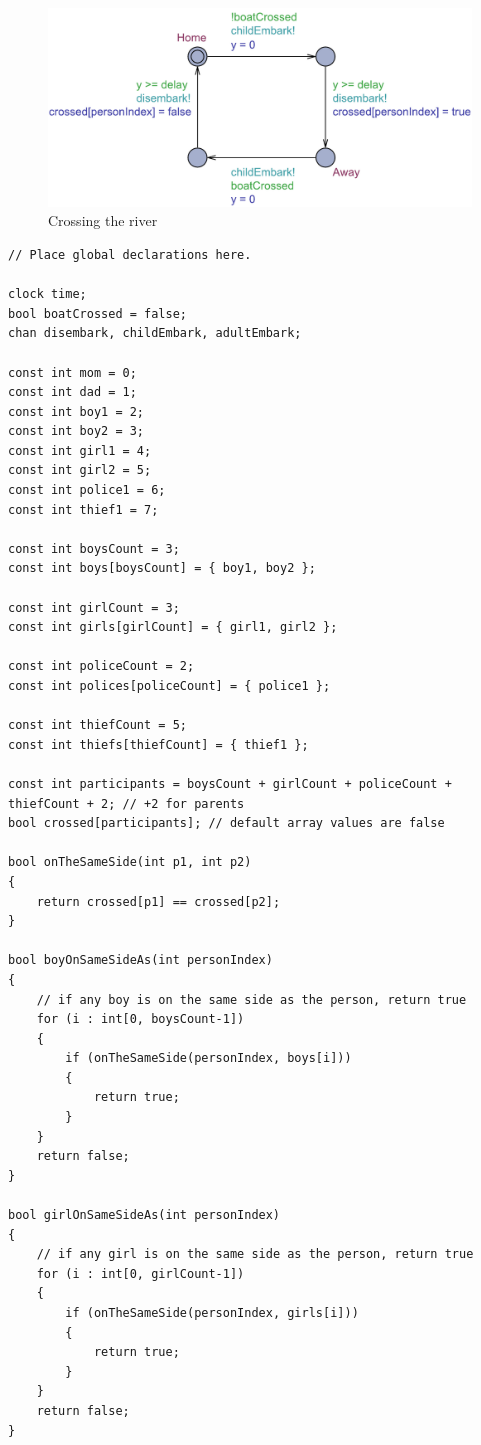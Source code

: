 \documentclass[a4paper,12pt]{article}
\begin{document}
\begin{figure}[H]
\centering
\includegraphics[width=\linewidth]{Child.pdf}
\caption{Crossing the river}
\end{figure}

\begin{lstlisting}
// Place global declarations here.

clock time;
bool boatCrossed = false;
chan disembark, childEmbark, adultEmbark;

const int mom = 0;
const int dad = 1;
const int boy1 = 2;
const int boy2 = 3;
const int girl1 = 4;
const int girl2 = 5;
const int police1 = 6;
const int thief1 = 7;

const int boysCount = 3;
const int boys[boysCount] = { boy1, boy2 };

const int girlCount = 3;
const int girls[girlCount] = { girl1, girl2 };

const int policeCount = 2;
const int polices[policeCount] = { police1 };

const int thiefCount = 5;
const int thiefs[thiefCount] = { thief1 };

const int participants = boysCount + girlCount + policeCount + thiefCount + 2; // +2 for parents
bool crossed[participants]; // default array values are false

bool onTheSameSide(int p1, int p2)
{
    return crossed[p1] == crossed[p2];
}

bool boyOnSameSideAs(int personIndex)
{
    // if any boy is on the same side as the person, return true
    for (i : int[0, boysCount-1])
    {
        if (onTheSameSide(personIndex, boys[i]))
        {
            return true;
        }
    }
    return false;
}

bool girlOnSameSideAs(int personIndex)
{
    // if any girl is on the same side as the person, return true
    for (i : int[0, girlCount-1])
    {
        if (onTheSameSide(personIndex, girls[i]))
        {
            return true;
        }
    }
    return false;
}


\end{lstlisting}
\end{document}
